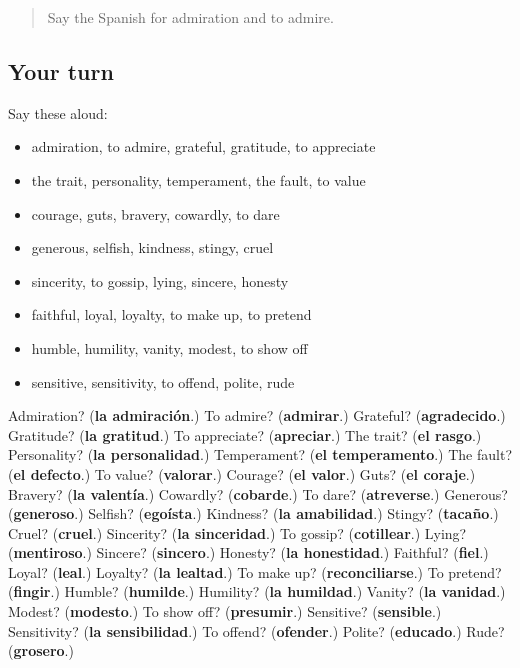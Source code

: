 \label{lesson:ES-R727-repaso-720-727}



\begin{quote}
Say the Spanish for admiration and to admire.
\end{quote}

\subsection*{Your turn}
Say these aloud:

\begin{itemize}
\raggedright
  \item admiration, to admire, grateful, gratitude, to appreciate
  \item the trait, personality, temperament, the fault, to value
  \item courage, guts, bravery, cowardly, to dare
  \item generous, selfish, kindness, stingy, cruel
  \item sincerity, to gossip, lying, sincere, honesty
  \item faithful, loyal, loyalty, to make up, to pretend
  \item humble, humility, vanity, modest, to show off
  \item sensitive, sensitivity, to offend, polite, rude
\end{itemize}

\begin{tcolorbox}[breakable,colback=teal!4,colframe=teal!35!black,title={Before you move on}]
Admiration? (\textbf{la admiración}.) To admire? (\textbf{admirar}.) Grateful? (\textbf{agradecido}.) Gratitude? (\textbf{la gratitud}.) To appreciate? (\textbf{apreciar}.) The trait? (\textbf{el rasgo}.) Personality? (\textbf{la personalidad}.) Temperament? (\textbf{el temperamento}.) The fault? (\textbf{el defecto}.) To value? (\textbf{valorar}.) Courage? (\textbf{el valor}.) Guts? (\textbf{el coraje}.) Bravery? (\textbf{la valentía}.) Cowardly? (\textbf{cobarde}.) To dare? (\textbf{atreverse}.) Generous? (\textbf{generoso}.) Selfish? (\textbf{egoísta}.) Kindness? (\textbf{la amabilidad}.) Stingy? (\textbf{tacaño}.) Cruel? (\textbf{cruel}.) Sincerity? (\textbf{la sinceridad}.) To gossip? (\textbf{cotillear}.) Lying? (\textbf{mentiroso}.) Sincere? (\textbf{sincero}.) Honesty? (\textbf{la honestidad}.) Faithful? (\textbf{fiel}.) Loyal? (\textbf{leal}.) Loyalty? (\textbf{la lealtad}.) To make up? (\textbf{reconciliarse}.) To pretend? (\textbf{fingir}.) Humble? (\textbf{humilde}.) Humility? (\textbf{la humildad}.) Vanity? (\textbf{la vanidad}.) Modest? (\textbf{modesto}.) To show off? (\textbf{presumir}.) Sensitive? (\textbf{sensible}.) Sensitivity? (\textbf{la sensibilidad}.) To offend? (\textbf{ofender}.) Polite? (\textbf{educado}.) Rude? (\textbf{grosero}.)
\end{tcolorbox}
